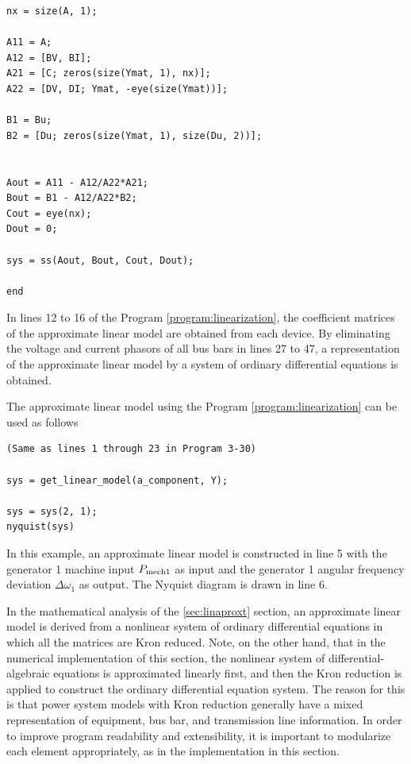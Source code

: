 \documentclass[graybox, envcountchap]{svmult}
\begin{document}
\begin{example}
\begin{PROGRAMA}[count,title={get\_linear\_model.m}]
\begin{verbatim}
nx = size(A, 1);

A11 = A;
A12 = [BV, BI];
A21 = [C; zeros(size(Ymat, 1), nx)];
A22 = [DV, DI; Ymat, -eye(size(Ymat))];

B1 = Bu;
B2 = [Du; zeros(size(Ymat, 1), size(Du, 2))];


Aout = A11 - A12/A22*A21;
Bout = B1 - A12/A22*B2;
Cout = eye(nx);
Dout = 0;

sys = ss(Aout, Bout, Cout, Dout);

end
\end{verbatim}
\end{PROGRAMA}

In lines 12 to 16 of the Program \ref{program:linearization}, the coefficient matrices of the approximate linear model are obtained from each device.
By eliminating the voltage and current phasors of all bus bars in lines 27 to 47, a representation of the approximate linear model by a system of ordinary differential equations is obtained.

The approximate linear model using the Program \ref{program:linearization} can be used as follows

\smallskip
\begin{PROGRAMA}[count,title={load\_impedance.m}]\label{program:main_linearization}
\begin{verbatim}
(Same as lines 1 through 23 in Program 3-30)

sys = get_linear_model(a_component, Y);

sys = sys(2, 1);
nyquist(sys)
\end{verbatim}
\end{PROGRAMA}

In this example, an approximate linear model is constructed in line 5 with the generator 1 machine input $P_{{\rm mech}1}$ as input and the generator 1 angular frequency deviation $\Delta\omega_1$ as output.
The Nyquist diagram is drawn in line 6.
\end{example}

In the mathematical analysis of the \ref{sec:linaproxt} section, an approximate linear model is derived from a nonlinear system of ordinary differential equations in which all the matrices are Kron reduced. 
Note, on the other hand, that in the numerical implementation of this section, the nonlinear system of differential-algebraic equations is approximated linearly first, and then the Kron reduction is applied to construct the ordinary differential equation system.
The reason for this is that power system models with Kron reduction generally have a mixed representation of equipment, bus bar, and transmission line information.
In order to improve program readability and extensibility, it is important to modularize each element appropriately, as in the implementation in this section.
\end{document}
